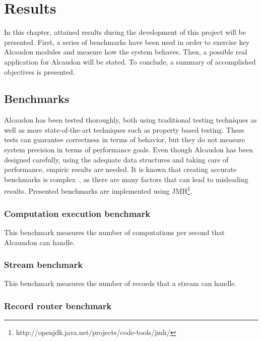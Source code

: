 \chapter{Results}

In this chapter, attained results during the development of this project will be
presented. First, a series of benchmarks have been used in order to exercise key
Alcaudon modules and measure how the system behaves. Then, a possible real
application for Alcaudon will be stated. To conclude, a summary of accomplished
objectives is presented.

\section{Benchmarks}

Alcaudon has been tested thoroughly, both using traditional testing techniques
as well as more state-of-the-art techniques such as property based testing.
These tests can guarantee correctness in terms of behavior, but they do not
measure system precision in terms of performance goals. Even though Alcaudon
has been designed carefully, using the adequate data structures and taking
care of performance, empiric results are needed. It is known that creating
accurate benchmarks is complex~\cite{benchbias}, as there are many factors
that can lead to misleading results. Presented benchmarks are implemented using
JMH\footnote{http://openjdk.java.net/projects/code-tools/jmh/}.

\subsection{Computation execution benchmark}

This benchmark measures the number of computations per second that Alcaundon can
handle.


\subsection{Stream benchmark}

This benchmark measures the number of records that a stream can handle.


\subsection{Record router benchmark}

